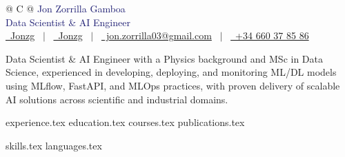 \documentclass[letterpaper, 11pt]{article}
\begin{document}

\begin{tabularx}{\linewidth}{@{} C @{}}
\Huge{\textcolor{MidnightBlue}{Jon Zorrilla Gamboa}} \\[7.5pt]
\textcolor{MidnightBlue}{Data Scientist \& AI Engineer} \\[7.5pt]

\href{https://linkedin.com/in/jonzg}{\raisebox{-0.05\height}\faLinkedin\ Jonzg} \ $|$ \ 
\href{https://github.com/jonzg}{\raisebox{-0.05\height}\faGithub\ Jonzg} \ $|$ \ 
\href{mailto:jon.zorrilla03@gmail.com}{\raisebox{-0.05\height}\faEnvelope \ jon.zorrilla03@gmail.com} \ $|$ \
\href{callto:+34 660 37 85 86}{\raisebox{-0.05\height}\faPhone \ +34 660 37 85 86} \  \ 
\end{tabularx}

\justify
Data Scientist \& AI Engineer with a Physics background and MSc in Data Science, experienced in developing, deploying, and monitoring ML/DL models using MLflow, FastAPI, and MLOps practices, with proven delivery of scalable AI solutions across scientific and industrial domains.

{experience.tex}
{education.tex}
{courses.tex}
{publications.tex}


\sidebyside
    {{skills.tex}}
    {{languages.tex}}
\end{document}
